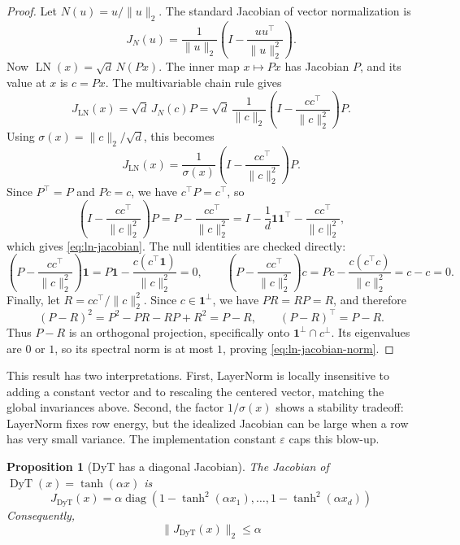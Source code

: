 \documentclass[11pt]{article}
\newtheorem{proposition}{Proposition}
\newcommand{\one}{\mathbf{1}}
\newcommand{\LN}{\operatorname{LN}}
\newcommand{\DyT}{\operatorname{DyT}}
\newcommand{\diag}{\operatorname{diag}}
\begin{document}
\begin{proof}
Let \(N(u)=u/\|u\|_2\). The standard Jacobian of vector normalization is
\[
    J_N(u)
    =
    \frac{1}{\|u\|_2}
    \left(I-\frac{uu^\top}{\|u\|_2^2}\right).
\]
Now \(\LN(x)=\sqrt d\,N(Px)\). The inner map \(x\mapsto Px\) has Jacobian \(P\), and its value at \(x\) is \(c=Px\). The multivariable chain rule gives
\[
    J_{\LN}(x)
    =
    \sqrt d\,J_N(c)P
    =
    \sqrt d\,
    \frac{1}{\|c\|_2}
    \left(I-\frac{cc^\top}{\|c\|_2^2}\right)P.
\]
Using \(\sigma(x)=\|c\|_2/\sqrt d\), this becomes
\[
    J_{\LN}(x)
    =
    \frac{1}{\sigma(x)}
    \left(I-\frac{cc^\top}{\|c\|_2^2}\right)P.
\]
Since \(P^\top=P\) and \(Pc=c\), we have \(c^\top P=c^\top\), so
\[
    \left(I-\frac{cc^\top}{\|c\|_2^2}\right)P
    =
    P-\frac{cc^\top}{\|c\|_2^2}
    =
    I-\frac{1}{d}\one\one^\top-\frac{cc^\top}{\|c\|_2^2},
\]
which gives \eqref{eq:ln-jacobian}. The null identities are checked directly:
\[
    \left(P-\frac{cc^\top}{\|c\|_2^2}\right)\one
    =
    P\one-\frac{c(c^\top\one)}{\|c\|_2^2}
    =
    0,
    \qquad
    \left(P-\frac{cc^\top}{\|c\|_2^2}\right)c
    =
    Pc-\frac{c(c^\top c)}{\|c\|_2^2}
    =
    c-c
    =
    0.
\]
Finally, let \(R=cc^\top/\|c\|_2^2\). Since \(c\in\one^\perp\), we have \(PR=RP=R\), and therefore
\[
    (P-R)^2
    =
    P^2-PR-RP+R^2
    =
    P-R,
    \qquad
    (P-R)^\top=P-R.
\]
Thus \(P-R\) is an orthogonal projection, specifically onto \(\one^\perp\cap c^\perp\). Its eigenvalues are \(0\) or \(1\), so its spectral norm is at most \(1\), proving \eqref{eq:ln-jacobian-norm}.
\end{proof}

This result has two interpretations. First, LayerNorm is locally insensitive to adding a constant vector and to rescaling the centered vector, matching the global invariances above. Second, the factor \(1/\sigma(x)\) shows a stability tradeoff: LayerNorm fixes row energy, but the idealized Jacobian can be large when a row has very small variance. The implementation constant \(\varepsilon\) caps this blow-up.

\begin{proposition}[DyT has a diagonal Jacobian]
The Jacobian of \(\DyT(x)=\tanh(\alpha x)\) is 
\begin{equation}
    J_{\DyT}(x)
    =
    \alpha \diag\left(
        1-\tanh^2(\alpha x_1),\ldots,1-\tanh^2(\alpha x_d)
    \right)
\label{eq:dyt-jacobian}
\end{equation}
Consequently,
\[
    \|J_{\DyT}(x)\|_2\leq \alpha
\]
\end{proposition}
\end{document}

